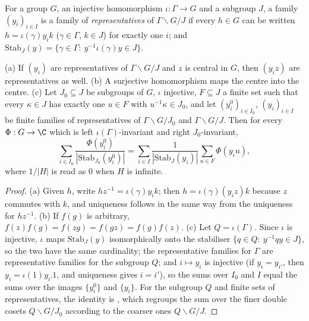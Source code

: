 For a group $G$, an injective homomorphism $\iota:\Gamma\to G$ and a subgroup $J$, a family $(y_i)_{i\in I}$ is a family
of \emph{representatives} of $\Gamma\backslash G/J$ if every $h\in G$ can be written $h=\iota(\gamma)y_ik$ ($\gamma\in\Gamma$,
$k\in J$) for exactly one $i$; and $\mathrm{Stab}_J(y)=\{\gamma\in\Gamma:\ y^{-1}\iota(\gamma)y\in J\}$.

\begin{lemma}\label{pf:baselat2:classsum}
\textup{(a)} If $(y_i)$ are representatives of $\Gamma\backslash G/J$ and $z$ is central in $G$, then $(y_iz)$ are
representatives as well.
\textup{(b)} A surjective homomorphism maps the centre into the centre.
\textup{(c)} Let $J_0\subseteq J$ be subgroups of $G$, $\iota$ injective, $F\subseteq J$ a finite set such that every
$\kappa\in J$ has exactly one $u\in F$ with $u^{-1}\kappa\in J_0$, and let $(y^0_i)_{i\in I_0}$, $(y_i)_{i\in I}$ be finite
families of representatives of $\Gamma\backslash G/J_0$ and $\Gamma\backslash G/J$. Then for every $\Phi:G\to\C$ which is left
$\iota(\Gamma)$-invariant and right $J_0$-invariant,
\[
  \sum_{i\in I_0}\frac{\Phi(y^0_i)}{|\mathrm{Stab}_{J_0}(y^0_i)|}=\sum_{i\in I}\frac{1}{|\mathrm{Stab}_J(y_i)|}\sum_{u\in F}\Phi(y_iu),
\]
where $1/|H|$ is read as $0$ when $H$ is infinite.
\end{lemma}

\begin{proof}
(a) Given $h$, write $hz^{-1}=\iota(\gamma)y_ik$; then $h=\iota(\gamma)(y_iz)k$ because $z$ commutes with $k$, and uniqueness
follows in the same way from the uniqueness for $hz^{-1}$. (b) If $f(g)$ is arbitrary, $f(z)f(g)=f(zg)=f(gz)=f(g)f(z)$.
(c) Let $Q=\iota(\Gamma)$. Since $\iota$ is injective, $\iota$ maps $\mathrm{Stab}_J(y)$ isomorphically onto the stabiliser
$\{q\in Q:\ y^{-1}qy\in J\}$, so the two have the same cardinality; the representative families for $\Gamma$ are
representative families for the subgroup $Q$; and $i\mapsto y_i$ is injective (if $y_i=y_{i'}$, then
$y_i=\iota(1)y_{i'}1$, and uniqueness gives $i=i'$), so the sums over $I_0$ and $I$ equal the sums over the images
$\{y^0_i\}$ and $\{y_i\}$. For the subgroup $Q$ and finite sets of representatives, the identity is
, which regroups the sum over the finer double cosets
$Q\backslash G/J_0$ according to the coarser ones $Q\backslash G/J$.
\end{proof}

